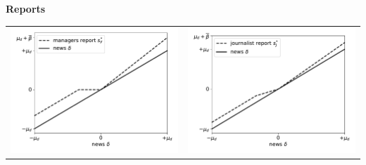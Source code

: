 \documentclass{article}
\begin{document}
\pagebreak
\begin{center}
	\textbf{Reports}
\end{center}
\begin{tabular}{cc}
	\includegraphics[scale=.5]{news_managers_report_news} & \includegraphics[scale=.5]{news_journalist_report_news} 
\end{tabular}
\end{document}
